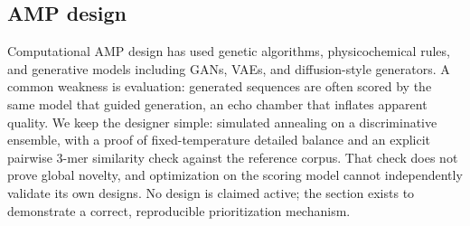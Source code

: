 \subsection{AMP design}
Computational AMP design has used genetic algorithms, physicochemical rules,
and generative models including GANs, VAEs, and diffusion-style generators.
A common weakness is evaluation: generated sequences are often scored by the
same model that guided generation, an echo chamber that inflates apparent
quality. We keep the designer simple: simulated annealing on a discriminative
ensemble, with a proof of fixed-temperature detailed balance and an
explicit pairwise 3-mer similarity check against the reference corpus.
That check does not prove global novelty, and optimization on the scoring
model cannot independently validate its own designs. No design is claimed active; the section exists to
demonstrate a correct, reproducible prioritization mechanism.

